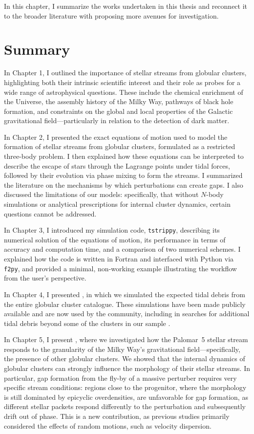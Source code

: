 In this chapter, I summarize the works undertaken in this thesis and reconnect it to the broader literature with proposing more avenues for investigation. 

\section{Summary}
    In Chapter 1, I outlined the importance of stellar streams from globular clusters, highlighting both their intrinsic scientific interest and their role as probes for a wide range of astrophysical questions. These include the chemical enrichment of the Universe, the assembly history of the Milky Way, pathways of black hole formation, and constraints on the global and local properties of the Galactic gravitational field—particularly in relation to the detection of dark matter.

    In Chapter 2, I presented the exact equations of motion used to model the formation of stellar streams from globular clusters, formulated as a restricted three-body problem. I then explained how these equations can be interpreted to describe the escape of stars through the Lagrange points under tidal forces, followed by their evolution via phase mixing to form the streams. I summarized the literature on the mechanisms by which perturbations can create gaps. I also discussed the limitations of our models: specifically, that without $N$-body simulations or analytical prescriptions for internal cluster dynamics, certain questions cannot be addressed.

    In Chapter 3, I introduced my simulation code, \texttt{tstrippy}, describing its numerical solution of the equations of motion, its performance in terms of accuracy and computation time, and a comparison of two numerical schemes. I explained how the code is written in Fortran and interfaced with Python via \texttt{f2py}, and provided a minimal, {\tiny non}-working example illustrating the workflow from the user's perspective.

    In Chapter 4, I presented \citet{2023A&A...673A..44F}, in which we simulated the expected tidal debris from the entire globular cluster catalogue. These simulations have been made publicly available and are now used by the community, including in searches for additional tidal debris beyond some of the clusters in our sample \citep{2025arXiv250705590K,2025ApJ...988...39W}.
    
    In Chapter 5, I present \citet{2025A&A...699A.289F}, where we investigated how the Palomar~5 stellar stream responds to the granularity of the Milky Way's gravitational field—specifically, the presence of other globular clusters. We showed that the internal dynamics of globular clusters can strongly influence the morphology of their stellar streams. In particular, gap formation from the fly-by of a massive perturber requires very specific stream conditions: regions close to the progenitor, where the morphology is still dominated by epicyclic overdensities, are unfavorable for gap formation, as different stellar packets respond differently to the perturbation and subsequently drift out of phase. This is a new contribution, as previous studies primarily considered the effects of random motions, such as velocity dispersion.

